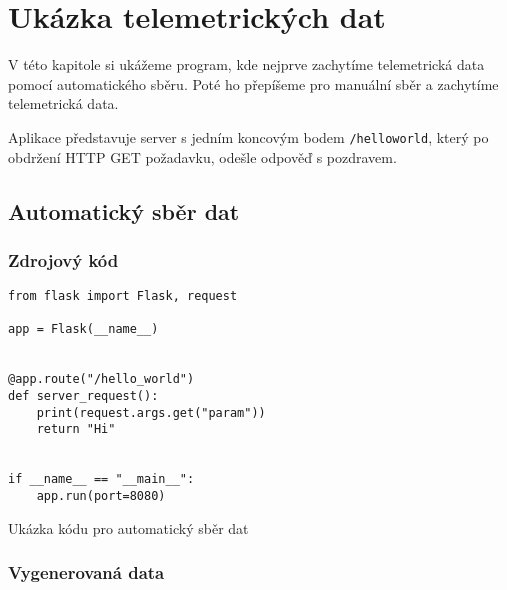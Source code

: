 \chapter{Ukázka telemetrických dat}
\label{data}
V této kapitole si ukážeme program, kde nejprve zachytíme telemetrická data pomocí automatického sběru. Poté ho přepíšeme pro manuální sběr a zachytíme telemetrická data.

Aplikace představuje server s jedním koncovým bodem \texttt{/hello\textunderscore world}, který po obdržení HTTP GET požadavku, odešle odpověď s pozdravem. 
\section*{Automatický sběr dat}
\label{auto}

\subsection*{Zdrojový kód}
\begin{listing}[H]
    \begin{verbatim}
from flask import Flask, request

app = Flask(__name__)


@app.route("/hello_world")
def server_request():
    print(request.args.get("param"))
    return "Hi"


if __name__ == "__main__":
    app.run(port=8080)
\end{verbatim}
    \caption{Ukázka kódu pro automatický sběr dat}
    \label{lst:exampleCode}
\end{listing}

\subsection*{Vygenerovaná data}

